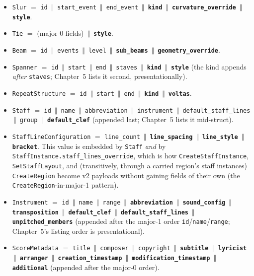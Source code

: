\documentclass[11pt,letterpaper]{report}
\newcommand{\cat}{\ensuremath{\,\Vert\,}}
\begin{document}
\begin{itemize}
  \item \texttt{Slur} $=$ \texttt{id} \cat{} \texttt{start\_event} \cat{}
    \texttt{end\_event} \cat{} \textbf{\texttt{kind}} \cat{}
    \textbf{\texttt{curvature\_override}} \cat{} \textbf{\texttt{style}}.
  \item \texttt{Tie} $=$ (major-0 fields) \cat{} \textbf{\texttt{style}}.
  \item \texttt{Beam} $=$ \texttt{id} \cat{} \texttt{events} \cat{}
    \texttt{level} \cat{} \textbf{\texttt{sub\_beams}} \cat{}
    \textbf{\texttt{geometry\_override}}.
  \item \texttt{Spanner} $=$ \texttt{id} \cat{} \texttt{start} \cat{}
    \texttt{end} \cat{} \texttt{staves} \cat{} \textbf{\texttt{kind}}
    \cat{} \textbf{\texttt{style}} (the kind appends \emph{after}
    \texttt{staves}; Chapter~5 lists it second, presentationally).
  \item \texttt{RepeatStructure} $=$ \texttt{id} \cat{} \texttt{start}
    \cat{} \texttt{end} \cat{} \textbf{\texttt{kind}} \cat{}
    \textbf{\texttt{voltas}}.
  \item \texttt{Staff} $=$ \texttt{id} \cat{} \texttt{name} \cat{}
    \texttt{abbreviation} \cat{} \texttt{instrument} \cat{}
    \texttt{default\_staff\_lines} \cat{} \texttt{group} \cat{}
    \textbf{\texttt{default\_clef}} (appended last; Chapter~5 lists it
    mid-struct).
  \item \texttt{StaffLineConfiguration} $=$ \texttt{line\_count} \cat{}
    \textbf{\texttt{line\_spacing}} \cat{} \textbf{\texttt{line\_style}}
    \cat{} \textbf{\texttt{bracket}}. This value is embedded by
    \texttt{Staff} \emph{and} by
    \texttt{StaffInstance.staff\_lines\_override}, which is how
    \texttt{CreateStaffInstance}, \texttt{SetStaffLayout}, and
    (transitively, through a carried region's staff instances)
    \texttt{CreateRegion} become v2 payloads without gaining fields of
    their own (the \texttt{CreateRegion}-in-major-1 pattern).
  \item \texttt{Instrument} $=$ \texttt{id} \cat{} \texttt{name} \cat{}
    \texttt{range} \cat{} \textbf{\texttt{abbreviation}} \cat{}
    \textbf{\texttt{sound\_config}} \cat{}
    \textbf{\texttt{transposition}} \cat{}
    \textbf{\texttt{default\_clef}} \cat{}
    \textbf{\texttt{default\_staff\_lines}} \cat{}
    \textbf{\texttt{unpitched\_members}} (appended after the major-1
    order \texttt{id}/\texttt{name}/\texttt{range}; Chapter~5's listing
    order is presentational).
  \item \texttt{ScoreMetadata} $=$ \texttt{title} \cat{}
    \texttt{composer} \cat{} \texttt{copyright} \cat{}
    \textbf{\texttt{subtitle}} \cat{} \textbf{\texttt{lyricist}} \cat{}
    \textbf{\texttt{arranger}} \cat{}
    \textbf{\texttt{creation\_timestamp}} \cat{}
    \textbf{\texttt{modification\_timestamp}} \cat{}
    \textbf{\texttt{additional}} (appended after the major-0 order).
\end{itemize}
\end{document}
